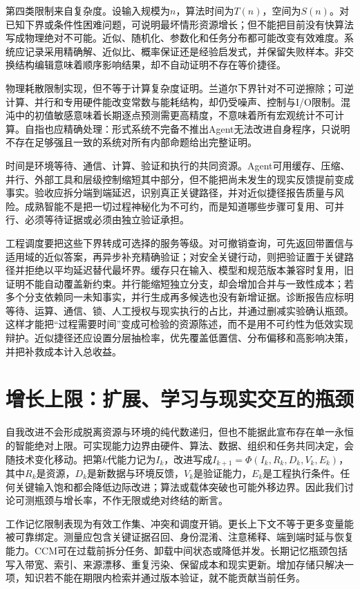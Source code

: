 第四类限制来自复杂度。设输入规模为$n$，算法时间为$T(n)$，空间为$S(n)$。对已知下界或条件性困难问题，可说明最坏情形资源增长；但不能把目前没有快算法写成物理绝对不可能。近似、随机化、参数化和任务分布都可能改变有效难度。系统应记录采用精确解、近似比、概率保证还是经验启发式，并保留失败样本。非交换结构编辑意味着顺序影响结果，却不自动证明不存在等价捷径。

物理耗散限制实现，但不等于计算复杂度证明。兰道尔下界针对不可逆擦除；可逆计算、并行和专用硬件能改变常数与能耗结构，却仍受噪声、控制与I/O限制。混沌中的初值敏感意味着长期逐点预测需更高精度，不意味着所有宏观统计不可计算。自指也应精确处理：形式系统不完备不推出Agent无法改进自身程序，只说明不存在足够强且一致的系统对所有内部命题给出完整证明。

时间是环境等待、通信、计算、验证和执行的共同资源。Agent可用缓存、压缩、并行、外部工具和层级控制缩短其中部分，但不能把尚未发生的现实反馈提前变成事实。验收应拆分端到端延迟，识别真正关键路径，并对近似捷径报告质量与风险。成熟智能不是把一切过程神秘化为不可约，而是知道哪些步骤可复用、可并行、必须等待证据或必须由独立验证承担。

工程调度要把这些下界转成可选择的服务等级。对可撤销查询，可先返回带置信与适用域的近似答案，再异步补充精确验证；对安全关键行动，则把验证置于关键路径并拒绝以平均延迟替代最坏界。缓存只在输入、模型和规范版本兼容时复用，旧证明不能自动覆盖新约束。并行能缩短独立分支，却会增加合并与一致性成本；若多个分支依赖同一未知事实，并行生成再多候选也没有新增证据。诊断报告应标明等待、运算、通信、锁、人工授权与现实执行的占比，并通过删减实验确认瓶颈。这样才能把“过程需要时间”变成可检验的资源陈述，而不是用不可约性为低效实现辩护。近似捷径还应设置分层抽检率，优先覆盖低置信、分布偏移和高影响决策，并把补救成本计入总收益。

\section{增长上限：扩展、学习与现实交互的瓶颈}
\label{sec:end_of_intelligence_explosion}

自我改进不会形成脱离资源与环境的纯代数递归，但也不能据此宣布存在单一永恒的智能绝对上限。可实现能力边界由硬件、算法、数据、组织和任务共同决定，会随技术变化移动。把第$k$代能力记为$I_k$，改进写成$I_{k+1}=\Phi(I_k,R_k,D_k,V_k,E_k)$，其中$R_k$是资源，$D_k$是新数据与环境反馈，$V_k$是验证能力，$E_k$是工程执行条件。任何关键输入饱和都会降低边际改进；算法或载体突破也可能外移边界。因此我们讨论可测瓶颈与增长率，不作无限或绝对终结的断言。

工作记忆限制表现为有效工作集、冲突和调度开销。更长上下文不等于更多变量能被可靠绑定。测量应包含关键证据召回、身份混淆、注意稀释、端到端时延与恢复能力。CCM可在过载前拆分任务、卸载中间状态或降低并发。长期记忆瓶颈包括写入带宽、索引、来源漂移、重复污染、保留成本和现实更新。增加存储只解决一项，知识若不能在期限内检索并通过版本验证，就不能贡献当前任务。

